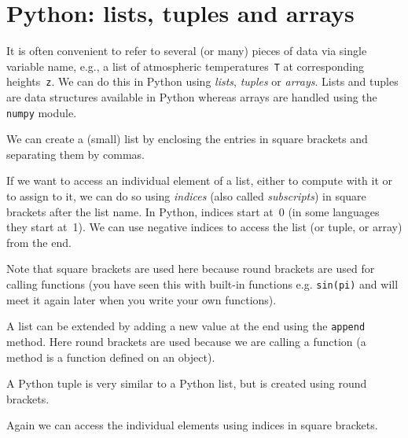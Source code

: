 \section{Python: lists, tuples and arrays}

It is often convenient to refer to several (or many) pieces of data
via single variable name, e.g., a list of atmospheric
temperatures~\texttt{T} at corresponding heights~\texttt{z}. We can do
this in Python using \textit{lists}, \textit{tuples} or
\textit{arrays}. Lists and tuples are data structures available in
Python whereas arrays are handled using the \texttt{numpy} module.

We can create a (small) list by enclosing the entries in square brackets
and separating them by commas.


If we want to access an individual element of a list, either to
compute with it or to assign to it, we can do so using
\textit{indices} (also called \textit{subscripts}) in square brackets
after the list name.  In Python, indices start at~0 (in some
languages they start at~1). We can use negative indices to
access the list (or tuple, or array) from the end.


Note that square brackets are used here because round brackets are
used for calling functions (you have seen this with built-in functions
e.g. \texttt{sin(pi)} and will meet it again later when you write your
own functions).


A list can be extended by adding a new value at the end using the
\texttt{append} method. Here round brackets are used because we are
calling a function (a method is a function defined on an object).


A Python tuple is very similar to a Python list, but is created using round brackets.


Again we can access the individual elements using indices in square brackets.


